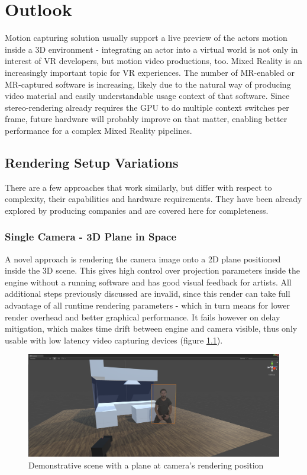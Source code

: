 %
\chapter{Outlook}

Motion capturing solution usually support a live preview of the actors motion 
inside a 3D environment - integrating an actor into a virtual world is not only 
in interest of VR developers, but motion video productions, too. Mixed Reality 
is an increasingly important topic for VR experiences. The number of MR-enabled 
or MR-captured software is increasing, likely due to the natural way of 
producing video material and easily understandable usage context of that 
software. Since stereo-rendering already requires the GPU to do multiple 
context switches per frame, future hardware will probably improve on that 
matter, enabling better performance for a complex Mixed Reality pipelines.

\section{Rendering Setup Variations}

There are a few approaches that work similarly, but differ with respect to 
complexity, their capabilities and hardware requirements. They have been 
already explored by producing companies and are covered here for completeness.

\subsection{Single Camera - 3D Plane in Space}

A novel approach is rendering the camera image onto a 2D plane positioned 
inside the 3D scene. This gives high control over projection parameters inside 
the engine without a running software and has good visual feedback for artists. 
All additional steps previously discussed are invalid, since this render can 
take full advantage of all runtime rendering parameters - which in turn means 
for lower render overhead and better graphical performance. It fails however on 
delay mitigation, which makes time drift between engine and camera visible, 
thus only usable with low latency video capturing devices (figure 
\ref{fig:alt-render:single-camera}).

\begin{figure}[htb]
	\includegraphics[width=\textwidth]{gfx/eval/plane-scene.png}
	\caption{Demonstrative scene with a plane at camera's rendering position}
	\label{fig:alt-render:single-camera}
\end{figure}

